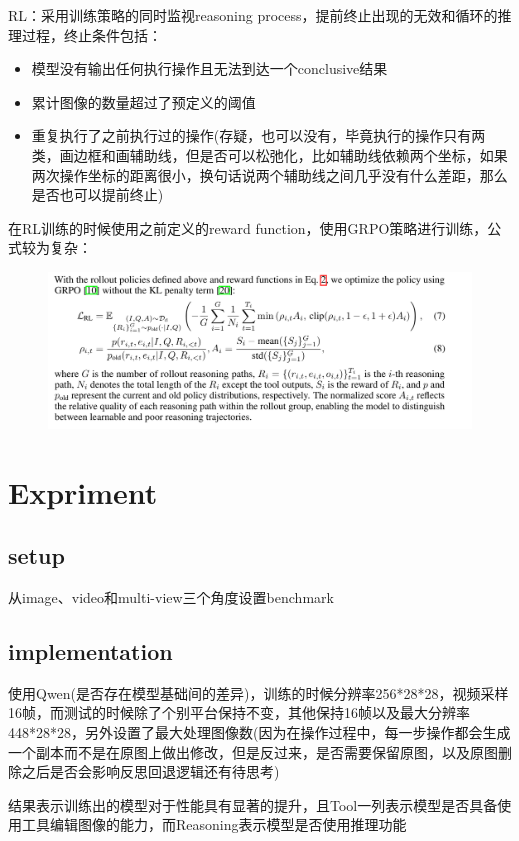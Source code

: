 \documentclass[a4paper,12pt]{article}
\begin{document}
RL：采用训练策略的同时监视reasoning process，提前终止出现的无效和循环的推理过程，终止条件包括：
\begin{itemize}
    \item 模型没有输出任何执行操作且无法到达一个conclusive结果
    \item 累计图像的数量超过了预定义的阈值
    \item 重复执行了之前执行过的操作(存疑，也可以没有，毕竟执行的操作只有两类，画边框和画辅助线，但是否可以松弛化，比如辅助线依赖两个坐标，如果两次操作坐标的距离很小，换句话说两个辅助线之间几乎没有什么差距，那么是否也可以提前终止)
\end{itemize}
在RL训练的时候使用之前定义的reward function，使用GRPO策略进行训练，公式较为复杂：
\begin{figure}[H]
    \centering
    \includegraphics[width=\textwidth]{equation.png}
\end{figure}

\section{Expriment}
\subsection{setup}
从image、video和multi-view三个角度设置benchmark

\subsection{implementation}
使用Qwen(是否存在模型基础间的差异)，训练的时候分辨率256*28*28，视频采样16帧，而测试的时候除了个别平台保持不变，其他保持16帧以及最大分辨率448*28*28，另外设置了最大处理图像数(因为在操作过程中，每一步操作都会生成一个副本而不是在原图上做出修改，但是反过来，是否需要保留原图，以及原图删除之后是否会影响反思回退逻辑还有待思考)

结果表示训练出的模型对于性能具有显著的提升，且Tool一列表示模型是否具备使用工具编辑图像的能力，而Reasoning表示模型是否使用推理功能
\end{document}
